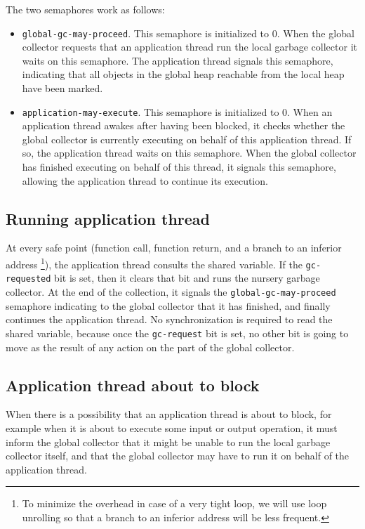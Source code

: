 The two semaphores work as follows:

\begin{itemize}
\item \texttt{global-gc-may-proceed}.  This semaphore is initialized to
  $0$.  When the global collector requests that an application thread
  run the local garbage collector it waits on this semaphore.  The
  application thread signals this semaphore, indicating that all
  objects in the global heap reachable from the local heap have been
  marked.
\item \texttt{application-may-execute}.  This semaphore is initialized
  to $0$.  When an application thread awakes after having been
  blocked, it checks whether the global collector is currently
  executing on behalf of this application thread.  If so, the
  application thread waits on this semaphore.  When the global
  collector has finished executing on behalf of this thread, it
  signals this semaphore, allowing the application thread to continue
  its execution.
\end{itemize}

\subsection{Running application thread}

At every safe point (function call, function return, and a branch to
an inferior address%
\footnote{To minimize the overhead in case of a very tight loop, we
  will use loop unrolling so that a branch to an inferior address will
  be less frequent.}), the application thread consults the shared
variable.  If the \texttt{gc-requested} bit is set, then it clears
that bit and runs the nursery garbage collector.  At the end of the
collection, it signals the \texttt{global-gc-may-proceed} semaphore
indicating to the global collector that it has finished, and finally
continues the application thread.  No synchronization is required to
read the shared variable, because once the \texttt{gc-request} bit is
set, no other bit is going to move as the result of any action on the
part of the global collector.

\subsection{Application thread about to block}

When there is a possibility that an application thread is about to
block, for example when it is about to execute some input or output
operation,  it must inform the global collector that it might be
unable to run the local garbage collector itself, and that the global
collector may have to run it on behalf of the application thread.


